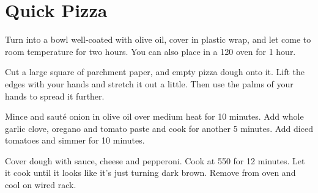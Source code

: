 \section{Quick Pizza}
\begin{recipe}



Turn into a bowl well-coated with olive oil, cover in plastic wrap, and let
come to room temperature for two hours. You can also place in a 120\degree{} oven
for 1 hour.

Cut a large square of parchment paper, and empty pizza dough onto it. Lift the
edges with your hands and stretch it out a little. Then use the palms of your
hands to spread it further.


Mince and sauté onion in olive oil over medium heat for 10 minutes. Add whole
garlic clove, oregano and tomato paste and cook for another 5 minutes. Add
diced tomatoes and simmer for 10 minutes.


Cover dough with sauce, cheese and pepperoni. Cook at 550\degree{} for 12 minutes.
Let it cook until it looks like it's just turning dark brown. Remove from oven
and cool on wired rack.


\end{recipe}
